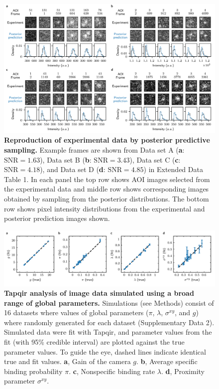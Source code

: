 \begin{figure}[h]
\centering
\includegraphics[width=\textwidth]{figures/figure4.png}
\caption{\textbf{Reproduction of experimental data by posterior predictive sampling.} Example frames are shown from Data set A  (\textbf{a}: $\mathrm{SNR}=1.63$), Data set B (\textbf{b}: $\mathrm{SNR}=3.43$), Data set C (\textbf{c}: $\mathrm{SNR}=4.18$), and Data set D (\textbf{d}: $\mathrm{SNR}=4.85$) in Extended Data Table 1. In each panel the top row shows AOI images selected from the experimental data and middle row shows corresponding images obtained by sampling from the posterior distributions. The bottom row shows pixel intensity distributions from the experimental and posterior prediction images shown. }
\label{fig:posterior_samples}
\end{figure}
\clearpage
\newpage

\begin{figure}[h]
\centering
\includegraphics[width=\textwidth]{extended-data/figure3.png}
\caption{\textbf{Tapqir analysis of image data simulated using a broad range of global parameters.} Simulations (see Methods) consist of 16 datasets where values of global parameters ($\pi$, $\lambda$, $\sigma^{xy}$, and $g$) where randomly generated for each dataset (Supplementary Data 2). Simulated data were fit with Tapqir, and parameter values from the fit (with 95\% credible interval) are plotted against the true parameter values. To guide the eye, dashed lines  indicate identical true and fit values. \textbf{a}, Gain of the camera $g$. \textbf{b}, Average specific binding probability $\pi$. \textbf{c}, Nonspecific binding rate $\lambda$. \textbf{d}, Proximity parameter $\sigma^{xy}$. }
\label{fig:tapqir_global}
\end{figure}
\pagebreak

